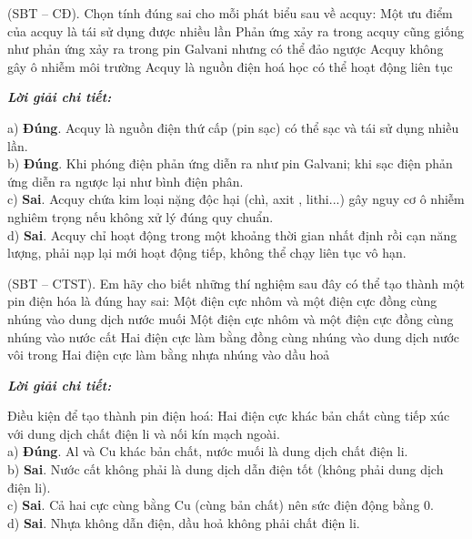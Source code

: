 \documentclass[11pt,a4paper]{article}
\def\loigiai#1{
\par\begingroup\color{blue!80!black}\small
\noindent\textbf{\textit{Lời giải chi tiết:}}\par
#1\par\endgroup}
\begin{document}
\setcounter{ex}{0}

\begin{ex}
(SBT – CĐ). Chọn tính đúng sai cho mỗi phát biểu sau về acquy:
\choiceTF
{\True Một ưu điểm của acquy là tái sử dụng được nhiều lần}
{\True Phản ứng xảy ra trong acquy cũng giống như phản ứng xảy ra trong pin Galvani nhưng có thể đảo ngược}
{Acquy không gây ô nhiễm môi trường}
{Acquy là nguồn điện hoá học có thể hoạt động liên tục}
\loigiai{
a) \textbf{Đúng}. Acquy là nguồn điện thứ cấp (pin sạc) có thể sạc và tái sử dụng nhiều lần.\\
b) \textbf{Đúng}. Khi phóng điện phản ứng diễn ra như pin Galvani; khi sạc điện phản ứng diễn ra ngược lại như bình điện phân.\\
c) \textbf{Sai}. Acquy chứa kim loại nặng độc hại (chì, axit \ce{H2SO4}, lithi...) gây nguy cơ ô nhiễm nghiêm trọng nếu không xử lý đúng quy chuẩn.\\
d) \textbf{Sai}. Acquy chỉ hoạt động trong một khoảng thời gian nhất định rồi cạn năng lượng, phải nạp lại mới hoạt động tiếp, không thể chạy liên tục vô hạn.}
\end{ex}

\begin{ex}
(SBT – CTST). Em hãy cho biết những thí nghiệm sau đây có thể tạo thành một pin điện hóa là đúng hay sai:
\choiceTF
{\True Một điện cực nhôm và một điện cực đồng cùng nhúng vào dung dịch nước muối}
{Một điện cực nhôm và một điện cực đồng cùng nhúng vào nước cất}
{Hai điện cực làm bằng đồng cùng nhúng vào dung dịch nước vôi trong}
{Hai điện cực làm bằng nhựa nhúng vào dầu hoả}
\loigiai{
Điều kiện để tạo thành pin điện hoá: Hai điện cực khác bản chất cùng tiếp xúc với dung dịch chất điện li và nối kín mạch ngoài.\\
a) \textbf{Đúng}. Al và Cu khác bản chất, nước muối \ce{NaCl} là dung dịch chất điện li.\\
b) \textbf{Sai}. Nước cất không phải là dung dịch dẫn điện tốt (không phải dung dịch điện li).\\
c) \textbf{Sai}. Cả hai cực cùng bằng Cu (cùng bản chất) nên sức điện động bằng 0.\\
d) \textbf{Sai}. Nhựa không dẫn điện, dầu hoả không phải chất điện li.}
\end{ex}
\end{document}
